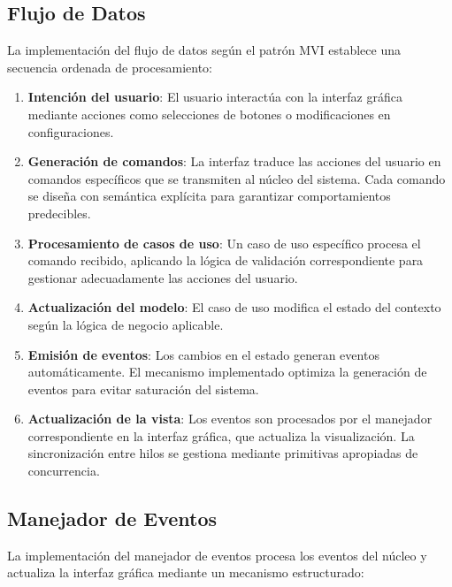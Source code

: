 \subsection{Flujo de Datos}

La implementación del flujo de datos según el patrón MVI establece una secuencia ordenada de procesamiento:

\begin{enumerate}
    \item \textbf{Intención del usuario}: El usuario interactúa con la interfaz gráfica mediante acciones como selecciones de botones o modificaciones en configuraciones.
    \item \textbf{Generación de comandos}: La interfaz traduce las acciones del usuario en comandos específicos que se transmiten al núcleo del sistema. Cada comando se diseña con semántica explícita para garantizar comportamientos predecibles.
    \item \textbf{Procesamiento de casos de uso}: Un caso de uso específico procesa el comando recibido, aplicando la lógica de validación correspondiente para gestionar adecuadamente las acciones del usuario.
    \item \textbf{Actualización del modelo}: El caso de uso modifica el estado del contexto según la lógica de negocio aplicable.
    \item \textbf{Emisión de eventos}: Los cambios en el estado generan eventos automáticamente. El mecanismo implementado optimiza la generación de eventos para evitar saturación del sistema.
    \item \textbf{Actualización de la vista}: Los eventos son procesados por el manejador correspondiente en la interfaz gráfica, que actualiza la visualización. La sincronización entre hilos se gestiona mediante primitivas apropiadas de concurrencia.
\end{enumerate}

\subsection{Manejador de Eventos}

La implementación del manejador de eventos procesa los eventos del núcleo y actualiza la interfaz gráfica mediante un mecanismo estructurado:

